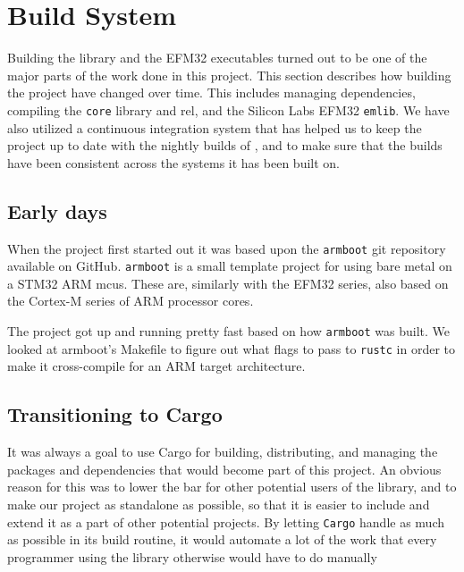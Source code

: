 \section{Build System}
\label{sec:build_system}

Building the library and the EFM32 executables turned out to be one of the major parts of the work done in this project.
This section describes how building the project have changed over time.
This includes managing dependencies, compiling the \texttt{core} library and \gls{rel}, and the Silicon Labs EFM32 \texttt{emlib}.
We have also utilized a continuous integration system that has helped us to keep the project up to date with the nightly builds of \rust, and to make sure that the builds have been consistent across the systems it has been built on.

\subsection{Early days}
\label{ssub:using_make}

When the project first started out it was based upon the \texttt{armboot} \cite{github:armboot} git repository available on GitHub.
\texttt{armboot} is a small template project for using \rust bare metal on a STM32 ARM \glspl{mcu}.
These are, similarly with the EFM32 series, also based on the Cortex-M series of ARM processor cores.

The project got up and running pretty fast based on how \texttt{armboot} was built.
We looked at armboot's Makefile to figure out what flags to pass to \texttt{rustc} in order to make it cross-compile for an ARM target architecture.

\subsection{Transitioning to Cargo}
\label{ssub:transitioning_to_cargo}

It was always a goal to use Cargo for building, distributing, and managing the packages and dependencies that would become part of this project.
An obvious reason for this was to lower the bar for other potential users of the library, and to make our project as standalone as possible, so that it is easier to include and extend it as a part of other potential projects.
By letting \texttt{Cargo} handle as much as possible in its build routine, it would automate a lot of the work that every programmer using the library otherwise would have to do manually

